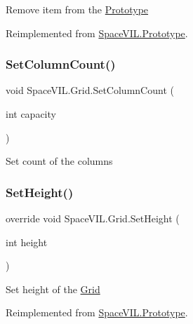 Remove item from the \mbox{\hyperlink{class_space_v_i_l_1_1_prototype}{Prototype}} 



Reimplemented from \mbox{\hyperlink{class_space_v_i_l_1_1_prototype_a7a2aabccfe6389f71d0265fa73f0ae87}{Space\+V\+I\+L.\+Prototype}}.

\mbox{\label{class_space_v_i_l_1_1_grid_a601c091730701ac3e117396686c9904d}} 
\subsubsection{\texorpdfstring{Set\+Column\+Count()}{SetColumnCount()}}
{\footnotesize\ttfamily void Space\+V\+I\+L.\+Grid.\+Set\+Column\+Count (\begin{DoxyParamCaption}\item[{int}]{capacity }\end{DoxyParamCaption})}



Set count of the columns 

\mbox{\label{class_space_v_i_l_1_1_grid_a64c7b1987fb8823330dbeaea7420369c}} 
\subsubsection{\texorpdfstring{Set\+Height()}{SetHeight()}}
{\footnotesize\ttfamily override void Space\+V\+I\+L.\+Grid.\+Set\+Height (\begin{DoxyParamCaption}\item[{int}]{height }\end{DoxyParamCaption})\hspace{0.3cm}{\ttfamily [virtual]}}



Set height of the \mbox{\hyperlink{class_space_v_i_l_1_1_grid}{Grid}} 



Reimplemented from \mbox{\hyperlink{class_space_v_i_l_1_1_prototype_adc0adcbd1c3800d9525798ba7be5832a}{Space\+V\+I\+L.\+Prototype}}.

